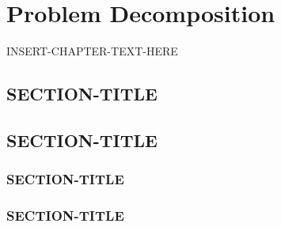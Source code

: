 \chapter{Problem Decomposition}
\thispagestyle{plain}

\label{ch:problem-decomposition}

INSERT-CHAPTER-TEXT-HERE

\section{SECTION-TITLE}
\label{SECTION-LABEL}

\section{SECTION-TITLE}
\label{SECTION-LABEL}

\subsection{SECTION-TITLE}
\label{SECTION-LABEL}

\subsection{SECTION-TITLE}
\label{SECTION-LABEL}
